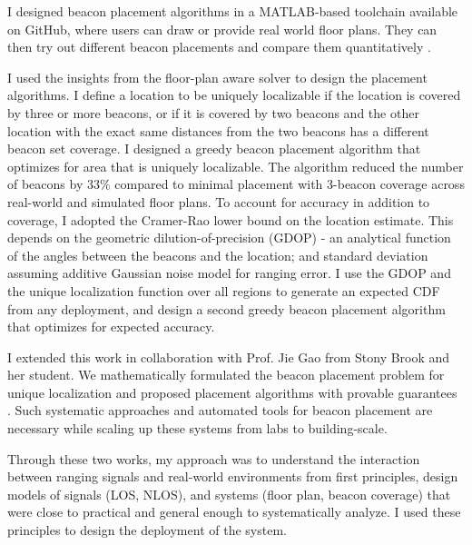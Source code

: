 \documentclass[10pt]{article}
\begin{document}
I designed beacon placement algorithms in a
MATLAB-based toolchain available on GitHub, where users can draw or provide real world floor plans. They can
then try out different beacon placements and compare them quantitatively \cite{rajagopal2016beacon}. 

I used the insights from the floor-plan aware solver to design the placement algorithms. 
I define a location to be uniquely localizable if the location is covered by three or more beacons, or if it is covered by two beacons and the other location with the exact same distances from the two beacons has a different beacon set coverage. I designed a greedy beacon placement algorithm that optimizes for area that is uniquely localizable.  The algorithm reduced the number of beacons by $33\%$ compared to minimal placement with 3-beacon coverage across real-world and simulated floor plans. 
To account for accuracy in addition to coverage, I adopted the Cramer-Rao lower bound on the location estimate. This depends on the geometric dilution-of-precision (GDOP) - an analytical function of the angles between the beacons and the location; and standard deviation assuming additive Gaussian noise model for ranging error. I use the GDOP and the unique localization function over all regions to generate an expected CDF from any deployment, and design a second greedy beacon placement algorithm that optimizes for expected accuracy.  

I extended this work in collaboration with
Prof. Jie Gao from Stony Brook and her student. We mathematically
formulated the beacon placement problem for unique localization and proposed placement
algorithms with provable guarantees \cite{beaconplacementtheory}. Such systematic approaches and automated tools for beacon
placement are necessary while scaling up these systems from labs to
building-scale. 

Through these two works, my approach was to understand the interaction between ranging signals and real-world environments from first principles, design models of signals (LOS, NLOS), and systems (floor plan, beacon coverage) that were close to practical and general enough to systematically analyze. I used these principles to design the deployment of the system. 


\end{document}
